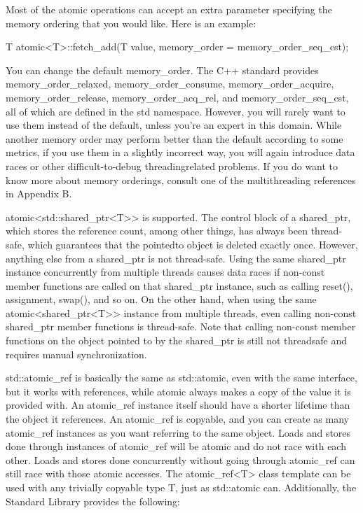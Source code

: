 Most of the atomic operations can accept an extra parameter specifying the memory ordering that you would like. Here is an example:

\begin{cpp}
T atomic<T>::fetch_add(T value, memory_order = memory_order_seq_cst);
\end{cpp}

You can change the default memory\_order. The C++ standard provides memory\_order\_relaxed, memory\_order\_consume, memory\_order\_acquire, memory\_order\_release, memory\_order\_acq\_rel, and memory\_order\_seq\_cst, all of which are defined in the std namespace. However, you will rarely want to use them instead of the default, unless you’re an expert in this domain. While another memory order may perform better than the default according to some metrics, if you use them in a slightly incorrect way, you will again introduce data races or other difficult-to-debug threadingrelated problems. If you do want to know more about memory orderings, consult one of the multithreading references in Appendix B.


atomic<std::shared\_ptr<T>> is supported. The control block of a shared\_ptr, which stores the reference count, among other things, has always been thread-safe, which guarantees that the pointedto object is deleted exactly once. However, anything else from a shared\_ptr is not thread-safe. Using the same shared\_ptr instance concurrently from multiple threads causes data races if non-const member functions are called on that shared\_ptr instance, such as calling reset(), assignment, swap(), and so on. On the other hand, when using the same atomic<shared\_ptr<T>{}> instance from multiple threads, even calling non-const shared\_ptr member functions is thread-safe. Note that calling non-const member functions on the object pointed to by the shared\_ptr is still not threadsafe and requires manual synchronization.


std::atomic\_ref is basically the same as std::atomic, even with the same interface, but it works with references, while atomic always makes a copy of the value it is provided with. An atomic\_ref instance itself should have a shorter lifetime than the object it references. An atomic\_ref is copyable, and you can create as many atomic\_ref instances as you want referring to the same object. Loads and stores done through instances of atomic\_ref will be atomic and do not race with each other. Loads and stores done concurrently without going through atomic\_ref can still race with those atomic accesses. The atomic\_ref<T> class template can be used with any trivially copyable type T, just as std::atomic can. Additionally, the Standard Library provides the following:

